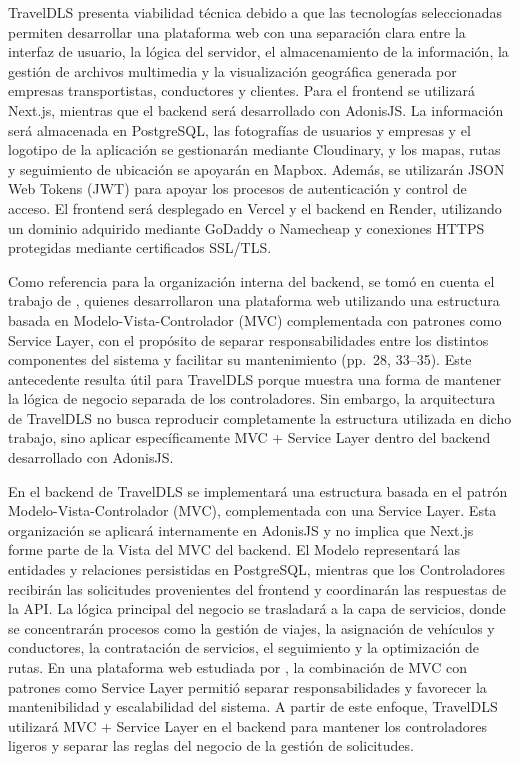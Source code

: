 TravelDLS presenta viabilidad técnica debido a que las tecnologías seleccionadas permiten desarrollar una plataforma web con una separación clara entre la interfaz de usuario, la lógica del servidor, el almacenamiento de la información, la gestión de archivos multimedia y la visualización geográfica generada por empresas transportistas, conductores y clientes. Para el frontend se utilizará Next.js, mientras que el backend será desarrollado con AdonisJS. La información será almacenada en PostgreSQL, las fotografías de usuarios y empresas y el logotipo de la aplicación se gestionarán mediante Cloudinary, y los mapas, rutas y seguimiento de ubicación se apoyarán en Mapbox. Además, se utilizarán JSON Web Tokens (JWT) para apoyar los procesos de autenticación y control de acceso. El frontend será desplegado en Vercel y el backend en Render, utilizando un dominio adquirido mediante GoDaddy o Namecheap y conexiones HTTPS protegidas mediante certificados SSL/TLS.

Como referencia para la organización interna del backend, se tomó en cuenta el trabajo de \textcite{arce2026arquitectura}, quienes desarrollaron una plataforma web utilizando una estructura basada en Modelo-Vista-Controlador (MVC) complementada con patrones como Service Layer, con el propósito de separar responsabilidades entre los distintos componentes del sistema y facilitar su mantenimiento (pp.~28, 33--35). Este antecedente resulta útil para TravelDLS porque muestra una forma de mantener la lógica de negocio separada de los controladores. Sin embargo, la arquitectura de TravelDLS no busca reproducir completamente la estructura utilizada en dicho trabajo, sino aplicar específicamente MVC + Service Layer dentro del backend desarrollado con AdonisJS.

En el backend de TravelDLS se implementará una estructura basada en el patrón Modelo-Vista-Controlador (MVC), complementada con una Service Layer. Esta organización se aplicará internamente en AdonisJS y no implica que Next.js forme parte de la Vista del MVC del backend. El Modelo representará las entidades y relaciones persistidas en PostgreSQL, mientras que los Controladores recibirán las solicitudes provenientes del frontend y coordinarán las respuestas de la API. La lógica principal del negocio se trasladará a la capa de servicios, donde se concentrarán procesos como la gestión de viajes, la asignación de vehículos y conductores, la contratación de servicios, el seguimiento y la optimización de rutas. En una plataforma web estudiada por \textcite{arce2026arquitectura}, la combinación de MVC con patrones como Service Layer permitió separar responsabilidades y favorecer la mantenibilidad y escalabilidad del sistema. A partir de este enfoque, TravelDLS utilizará MVC + Service Layer en el backend para mantener los controladores ligeros y separar las reglas del negocio de la gestión de solicitudes.

